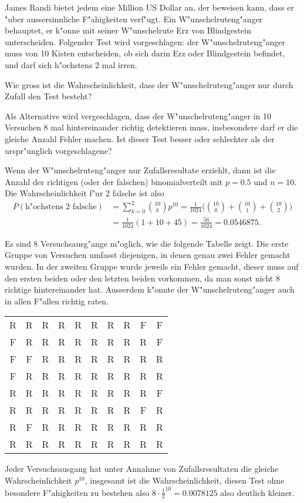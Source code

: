 James Randi bietet jedem eine Million US Dollar an, der beweisen kann,
dass er "uber aussersinnliche F"ahigkeiten verf"ugt. Ein W"unschelruteng"anger
behauptet, er k"onne mit seiner W"unschelrute Erz von Blindgestein
unterscheiden. Folgender Test wird vorgeschlagen: der W"unschelruteng"anger
muss von 10 Kisten entscheiden, ob sich darin Erz oder Blindgestein
befindet, und darf sich h"ochstens 2 mal irren.
\begin{teilaufgaben}
\item
Wie gross ist die
Wahrscheinlichkeit, dass der W"unschelruteng"anger nur durch Zufall
den Test besteht?
\item
Als Alternative wird vergeschlagen, dass der W"unschelruteng"anger
in 10 Versuchen
8 mal hintereinander richtig detektieren muss, insbesondere darf
er die gleiche Anzahl Fehler machen.
Ist dieser Test
besser oder schlechter als der urspr"unglich vorgeschlagene?
\end{teilaufgaben}

\begin{loesung}
\begin{teilaufgaben}
\item Wenn der W"unschelruteng"anger nur Zufallsresultate erziehlt,
dann ist die Anzahl der richtigen (oder der falschen) binomialverteilt
mit $p=0.5$ und $n=10$. Die Wahrscheinlichkeit f"ur 2 falsche ist also
\begin{align*}
P(\text{h"ochstens 2 falsche})&=\sum_{k=0}^2 \binom{10}{k}p^{10}
=
\frac1{1024}\biggl(
\binom{10}{0}
+
\binom{10}{1}
+
\binom{10}{2}
\biggr)
\\
&=
\frac1{1024}( 1 + 10 + 45)
=\frac{56}{1024}=0.0546875.
\end{align*}
\item Es sind 8 Versuchsausg"ange m"oglich, wie die folgende Tabelle
zeigt. Die erste Gruppe von Versuchen umfasst diejenigen, in denen
genau zwei Fehler gemacht wurden. In der zweiten Gruppe wurde jeweils
ein Fehler gemacht, dieser muss auf den ersten beiden oder den letzten
beiden vorkommen, da man sonst nicht 8 richtige hintereinander hat.
Ausserdem k"onnte der W"unschelruteng"anger auch in allen F"allen richtig
raten.
\begin{center}
\begin{tabular}{cccccccccc}
R&R&R&R&R&R&R&R&F&F\\
F&R&R&R&R&R&R&R&R&F\\
F&F&R&R&R&R&R&R&R&R\\
\hline
F&R&R&R&R&R&R&R&R&R\\
R&R&R&R&R&R&R&R&R&F\\
R&R&R&R&R&R&R&R&F&R\\
R&F&R&R&R&R&R&R&R&R\\
\hline
R&R&R&R&R&R&R&R&R&R
\end{tabular}
\end{center}
Jeder Versuchsausgang hat unter Annahme von Zufallsresultaten die gleiche
Wahrscheinlichkeit
$p^{10}$, insgesamt ist die Wahrscheinlichkeit, diesen Test ohne
besondere F"ahigkeiten zu bestehen also $8\cdot \frac12^{10}=0.0078125$
also deutlich kleiner.
\end{teilaufgaben}
\end{loesung}

